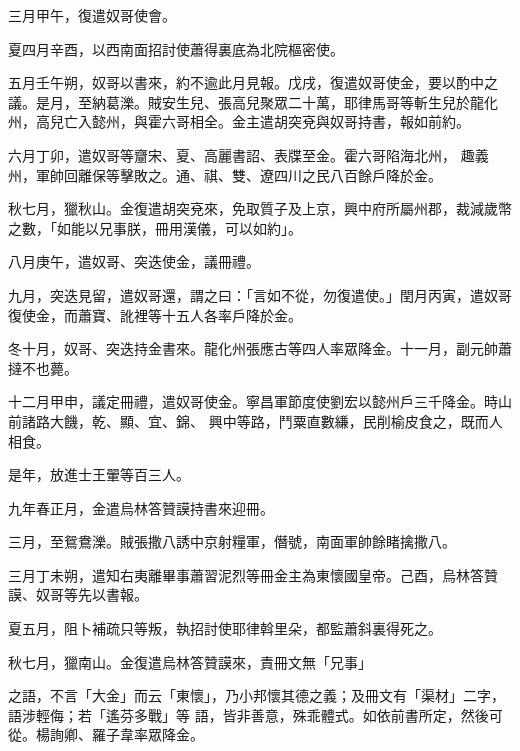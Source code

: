 \begin{pinyinscope}
 三月甲午，復遣奴哥使會。



 夏四月辛酉，以西南面招討使蕭得裏底為北院樞密使。



 五月壬午朔，奴哥以書來，約不逾此月見報。戊戌，復遣奴哥使金，要以酌中之議。是月，至納葛濼。賊安生兒、張高兒聚眾二十萬，耶律馬哥等斬生兒於龍化州，高兒亡入懿州，與霍六哥相全。金主遣胡突兗與奴哥持書，報如前約。



 六月丁卯，遣奴哥等齏宋、夏、高麗書詔、表牒至金。霍六哥陷海北州，
 趣義州，軍帥回離保等擊敗之。通、祺、雙、遼四川之民八百餘戶降於金。



 秋七月，獵秋山。金復遣胡突兗來，免取質子及上京，興中府所屬州郡，裁減歲幣之數，「如能以兄事朕，冊用漢儀，可以如約」。



 八月庚午，遣奴哥、突迭使金，議冊禮。



 九月，突迭見留，遣奴哥還，謂之曰：「言如不從，勿復遣使。」閏月丙寅，遣奴哥復使金，而蕭寶、訛裡等十五人各率戶降於金。



 冬十月，奴哥、突迭持金書來。龍化州張應古等四人率眾降金。十一月，副元帥蕭撻不也薨。



 十二月甲申，議定冊禮，遣奴哥使金。寧昌軍節度使劉宏以懿州戶三千降金。時山前諸路大饑，乾、顯、宜、錦、
 興中等路，鬥粟直數縑，民削榆皮食之，既而人相食。



 是年，放進士王翬等百三人。



 九年春正月，金遣烏林答贊謨持書來迎冊。



 三月，至鴛鴦濼。賊張撒八誘中京射糧軍，僭號，南面軍帥餘睹擒撒八。



 三月丁未朔，遣知右夷離畢事蕭習泥烈等冊金主為東懷國皇帝。己酉，烏林答贊謨、奴哥等先以書報。



 夏五月，阻卜補疏只等叛，執招討使耶律斡里朵，都監蕭斜裏得死之。



 秋七月，獵南山。金復遣烏林答贊謨來，責冊文無「兄事」



 之語，不言「大金」而云「東懷」，乃小邦懷其德之義；及冊文有「渠材」二字，語涉輕侮；若「遙芬多戰」等
 語，皆非善意，殊乖體式。如依前書所定，然後可從。楊詢卿、羅子韋率眾降金。




\end{pinyinscope}
